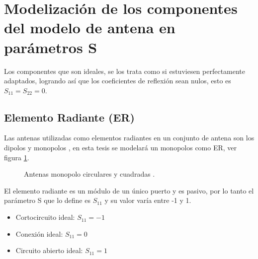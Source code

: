 \section{Modelización de los componentes del modelo de antena en parámetros S}

Los componentes que son ideales, se los trata como si estuviesen perfectamente adaptados, logrando así que los coeficientes
de reflexión sean nulos, esto es $S_{11} = S_{22} = 0$. 


\subsection{Elemento Radiante (ER)}

Las antenas utilizadas como elementos radiantes en un conjunto de antena son los dipolos y monopolos \cite{Balanis2012}, en esta
tesis se modelará un monopolos como ER, ver figura \ref{fig:radiatingElement}.
\begin{figure}[H]
	\centering
		\caption{Antenas monopolo circulares y cuadradas \cite{Balanis2012}.}
	\label{fig:radiatingElement}
\end{figure}

El elemento radiante es un módulo de un único puerto y es pasivo, por lo tanto el parámetro S que lo define es $S_{11}$ y su
valor varía entre -1 y 1.

\begin{itemize}
	\item Cortocircuito ideal: $S_{11} = -1$
	\item Conexión ideal: $S_{11} = 0$
	\item Circuito abierto ideal: $S_{11} = 1$
\end{itemize}

